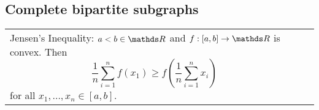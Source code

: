 \subsection{Complete bipartite subgraphs}

\begin{tabularx}{\textwidth}{ X!{\color{git90gray}\vrule} X }

    {\color{def}Jensen's Inequality}: $a<b\in\R$ and $f:[a,b]\to\R$ is convex. Then
    $$\frac1n\sum\limits_{i=1}^nf(x_1)\geq f(\frac1n\sum\limits_{i=1}^nx_i)$$
    for all $x_1,...,x_n\in[a,b]$.

\end{tabularx}